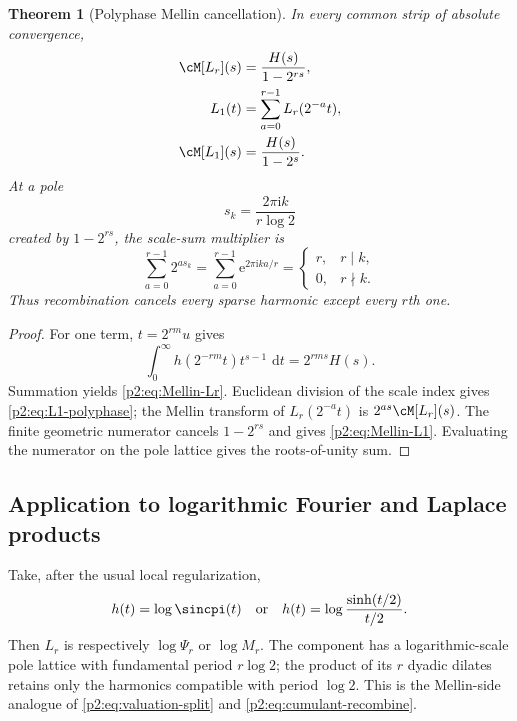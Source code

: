 \documentclass[11pt,oneside]{article}
\newtheorem{theorem}{Theorem}[section]
\theoremstyle{definition}
\newcommand{\dd}{\,\mathrm d}
\newcommand{\e}{\mathrm e}
\newcommand{\ii}{\mathrm i}
\begin{document}
\begin{theorem}[Polyphase Mellin cancellation]
\label{p2:thm:Mellin-cancellation}
In every common strip of absolute convergence,
\begin{align}
 \cM[L_r](s)&=\frac{H(s)}{1-2^{rs}},                        \label{p2:eq:Mellin-Lr}\\
 L_1(t)&=\sum_{a=0}^{r-1}L_r(2^{-a}t),                      \label{p2:eq:L1-polyphase}\\
 \cM[L_1](s)&=\frac{H(s)}{1-2^s}.                          \label{p2:eq:Mellin-L1}
\end{align}
At a pole
\begin{equation}
 s_k=\frac{2\pi\ii k}{r\log2}                              \label{p2:eq:sparse-pole-lattice}
\end{equation}
created by $1-2^{rs}$, the scale-sum multiplier is
\begin{equation}
 \sum_{a=0}^{r-1}2^{as_k}
 =\sum_{a=0}^{r-1}\e^{2\pi\ii ka/r}
 =\begin{cases}r,&r\mid k,\\0,&r\nmid k.
 \end{cases}                                               \label{p2:eq:roots-unity-cancel}
\end{equation}
Thus recombination cancels every sparse harmonic except every $r$th one.
\end{theorem}

\begin{proof}
For one term, $t=2^{rm}u$ gives
\[
 \int_0^{\infty}h(2^{-rm}t)t^{s-1}\,\dd t=2^{rms}H(s).
\]
Summation yields \eqref{p2:eq:Mellin-Lr}.  Euclidean division of the scale index
gives \eqref{p2:eq:L1-polyphase}; the Mellin transform of $L_r(2^{-a}t)$ is
$2^{as}\cM[L_r](s)$.  The finite geometric numerator cancels
$1-2^{rs}$ and gives \eqref{p2:eq:Mellin-L1}.  Evaluating the numerator on the
pole lattice gives the roots-of-unity sum.
\end{proof}

\subsection{Application to logarithmic Fourier and Laplace products}

Take, after the usual local regularization,
\begin{equation}
 h(t)=\log\sincpi(t)
 \quad\text{or}\quad
 h(t)=\log\frac{\sinh(t/2)}{t/2}.                           \label{p2:eq:Mellin-kernels}
\end{equation}
Then $L_r$ is respectively $\log\Psi_r$ or $\log M_r$.  The component has a
logarithmic-scale pole lattice with fundamental period $r\log2$; the product of
its $r$ dyadic dilates retains only the harmonics compatible with period
$\log2$.  This is the Mellin-side analogue of
\eqref{p2:eq:valuation-split} and \eqref{p2:eq:cumulant-recombine}.
\end{document}
